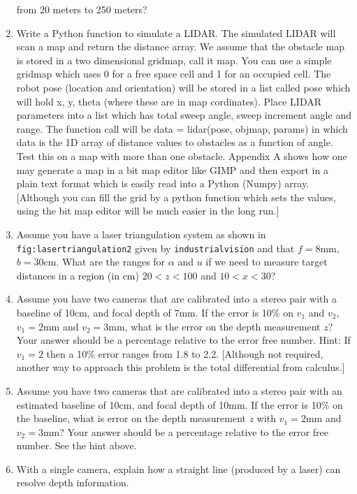 \begin{enumerate}
  from 20 meters to 250 meters?
\item
  Write a Python function to simulate a LIDAR. The simulated LIDAR will
  scan a map and return the distance array. We assume that the obstacle
  map is stored in a two dimensional gridmap, call it map. You can use a
  simple gridmap which uses 0 for a free space cell and 1 for an
  occupied cell. The robot pose (location and orientation) will be
  stored in a list called pose which will hold x, y, theta (where these
  are in map cordinates). Place LIDAR parameters into a list which has
  total sweep angle, sweep increment angle and range. The function call
  will be data = lidar(pose, objmap, params) in which data is the 1D
  array of distance values to obstacles as a function of angle. Test
  this on a map with more than one obstacle. Appendix A shows how one
  may generate a map in a bit map editor like GIMP and then export in a
  plain text format which is easily read into a Python (Numpy) array.
  {[}Although you can fill the grid by a python function which sets the
  values, using the bit map editor will be much easier in the long
  run.{]}
\item
  Assume you have a laser triangulation system as shown in
  \texttt{fig:lasertriangulation2} given by \texttt{industrialvision}
  and that \(f  = 8\)mm, \(b = 30\)cm. What are the ranges for
  \(\alpha\) and \(u\) if we need to measure target distances in a
  region (in cm) \(20 < z < 100\) and \(10 < x < 30\)?
\item
  Assume you have two cameras that are calibrated into a stereo pair
  with a baseline of 10cm, and focal depth of 7mm. If the error is 10\%
  on \(v_1\) and \(v_2\), \(v_1 =  2\)mm and \(v_2 = 3\)mm, what is the
  error on the depth measurement \(z\)? Your answer should be a
  percentage relative to the error free number. Hint: If \(v_1 = 2\)
  then a 10\% error ranges from 1.8 to 2.2. {[}Although not required,
  another way to approach this problem is the total differential from
  calculus.{]}
\item
  Assume you have two cameras that are calibrated into a stereo pair
  with an estimated baseline of 10cm, and focal depth of 10mm. If the
  error is 10\% on the baseline, what is error on the depth measurement
  \(z\) with \(v_1 = 2\)mm and \(v_2 = 3\)mm? Your answer should be a
  percentage relative to the error free number. See the hint above.
\item
  With a single camera, explain how a straight line (produced by a
  laser) can resolve depth information.
\end{enumerate}
